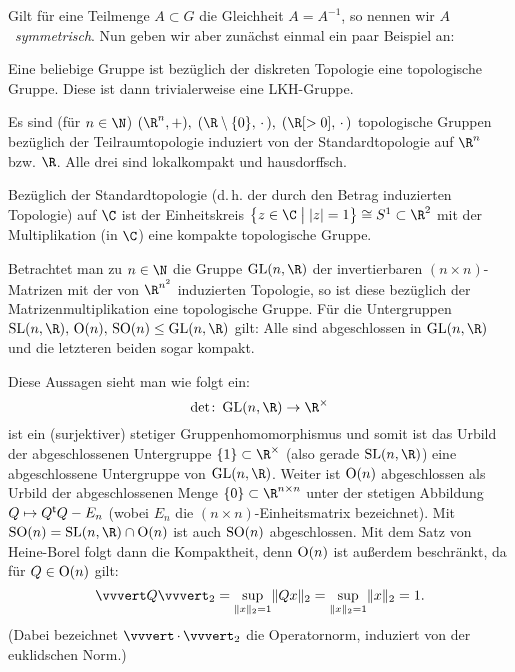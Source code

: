 Gilt für eine Teilmenge $A\subset G$ die Gleichheit $A=A^{-1}$, so nennen wir
$A$~\emph{symmetrisch}. Nun geben wir aber zunächst einmal ein paar Beispiel an:
\begin{BspList}[\label{tg:topogrpbsp}]
\item
    Eine beliebige Gruppe ist bezüglich der diskreten Topologie eine
    topologische Gruppe. Diese ist dann trivialerweise eine LKH-Gruppe.
    
\item
    Es sind (für $n\in\N$) $(\R^n,+),\; (\R\setminus\{0\}, \,\cdot\,),\; 
    (\R[>0], \,\cdot\,)$ topologische Gruppen bezüglich der Teilraumtopologie
    induziert von der Standardtopologie auf $\R^n$ bzw. $\R$. Alle drei sind
    lokalkompakt und hausdorffsch.

\item
    Bezüglich der Standardtopologie (d.\,h. der durch den Betrag induzierten
    Topologie) auf $\C$ ist der Einheitskreis 
    $\left\{ z\in\C \;\big\vert\; \abs{z}=1 \right\} \cong S^1 \subset \R^2$ mit
    der Multiplikation (in $\C$) eine kompakte topologische Gruppe.

\item
    Betrachtet man zu $n\in\N$ die Gruppe $\matGL(n,\R)$ der
    invertierbaren $(n\!\times\!n)$-Matrizen mit der von $\R^{n^2}$ induzierten
    Topologie, so ist diese bezüglich der Matrizenmultiplikation eine
    topologische Gruppe. Für die Untergruppen $\matSL(n,\R),\,\matO(n),\,\matSO(n)
    \leq \matGL(n,\R)$ gilt: Alle sind abgeschlossen in $\matGL(n,\R)$ und
    die letzteren beiden sogar kompakt.
    
    Diese Aussagen sieht man wie folgt ein:
    \[ \det\colon\matGL(n,\R)\to\R^\times 
    \] 
    ist ein (surjektiver) stetiger Gruppenhomomorphismus und somit ist das
    Urbild der abgeschlossenen Untergruppe $\{1\} \subset \R^\times$ (also
    gerade $\matSL(n,\R)$) eine abgeschlossene Untergruppe von $\matGL(n,\R)$.
    Weiter ist $\operatorname{O}(n)$ abgeschlossen als Urbild der abgeschlossenen Menge
    $\{0\} \subset \R^{n\times n}$ unter der stetigen Abbildung $Q\mapsto Q^\mathsf{t} Q - E_n$
    (wobei $E_n$ die $(n\!\times\!n)$-Einheitsmatrix bezeichnet). Mit $\matSO(n)
    = \matSL(n,\R) \cap \matO(n)$ ist auch $\operatorname{SO}(n)$ abgeschlossen.
    Mit dem Satz von Heine-Borel folgt dann die Kompaktheit, denn $\operatorname{O}(n)$ ist
    außerdem beschränkt, da für $Q\in\operatorname{O}(n)$ gilt: 
    \[ \opnorm{Q}_2 = \sup_{\norm{x}_2=1} \norm{Qx}_2 
        = \sup_{\norm{x}_2=1} \norm{x}_2 = 1
    . \]
    (Dabei bezeichnet $\opnorm{\,\cdot\,}_2$ die Operatornorm, induziert von der
    euklidschen Norm.)
    

\end{BspList}
